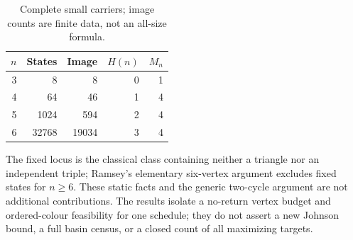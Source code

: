 \documentclass[a4paper,10pt]{amsart}
\theoremstyle{remark}
\begin{document}
\begin{table}[h]
\centering
\caption{Complete small carriers; image counts are finite data, not an all-size formula.}
\label{tab:checks}
\begin{tabular}{rrrrr}
\toprule
$n$ & States & Image & $H(n)$ & $M_n$\\
\midrule
3&8&8&0&1\\
4&64&46&1&4\\
5&1024&594&2&4\\
6&32768&19034&3&4\\
\bottomrule
\end{tabular}
\end{table}

The fixed locus is the classical class containing neither a triangle nor
an independent triple; Ramsey's elementary six-vertex argument excludes
fixed states for $n\ge6$. These static facts and the generic two-cycle
argument are not additional contributions. The results isolate a
no-return vertex budget and ordered-colour feasibility for one schedule;
they do not assert a new Johnson bound, a full basin census, or a closed
count of all maximizing targets.



\end{document}
